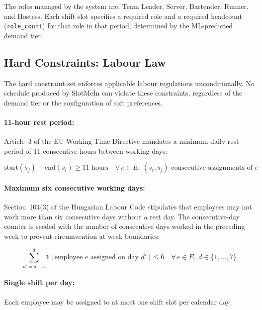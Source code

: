 \documentclass[12pt,a4paper,oneside]{article}
\begin{document}
The roles managed by the system are: Team Leader, Server, Bartender, Runner, and Hostess. Each shift slot specifies a required role and a required headcount (\texttt{role\_count}) for that role in that period, determined by the ML-predicted demand tier.

\subsection{Hard Constraints: Labour Law}

The hard constraint set enforces applicable labour regulations unconditionally. No schedule produced by SlotMeIn can violate these constraints, regardless of the demand tier or the configuration of soft preferences.

\paragraph{11-hour rest period:} Article~3 of the EU Working Time Directive \citep{wtd2003} mandates a minimum daily rest period of 11 consecutive hours between working days:

\begin{equation}
\text{start}(s_j) - \text{end}(s_i) \geq 11 \text{ hours} \quad \forall\, e \in E,\ (s_i, s_j) \text{ consecutive assignments of } e
\label{eq:rest}
\end{equation}

\paragraph{Maximum six consecutive working days:} Section~104(3) of the Hungarian Labour Code \citep{hungarian2012} stipulates that employees may not work more than six consecutive days without a rest day. The consecutive-day counter is seeded with the number of consecutive days worked in the preceding week to prevent circumvention at week boundaries:

\begin{equation}
\sum_{d'=d-5}^{d} \mathbf{1}[\text{employee } e \text{ assigned on day } d'] \leq 6 \quad \forall\, e \in E,\ d \in \{1, \ldots, 7\}
\label{eq:consecutive}
\end{equation}

\paragraph{Single shift per day:} Each employee may be assigned to at most one shift slot per calendar day:
\end{document}
